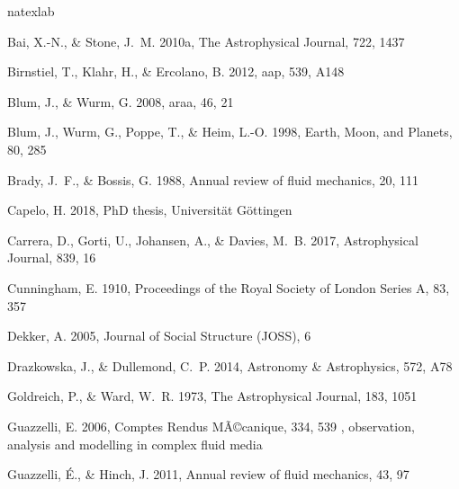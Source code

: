 %
%
\begin{thebibliography}{}
\expandafter\ifx\csname natexlab\endcsname\relax\def\natexlab#1{#1}\fi

Bai, X.-N., \& Stone, J.~M. 2010a, The Astrophysical Journal, 722, 1437

{Birnstiel}, T., {Klahr}, H., \& {Ercolano}, B. 2012, aap, 539, A148

{Blum}, J., \& {Wurm}, G. 2008, araa, 46, 21

Blum, J., Wurm, G., Poppe, T., \& Heim, L.-O. 1998, Earth, Moon, and Planets,
  80, 285

Brady, J.~F., \& Bossis, G. 1988, Annual review of fluid mechanics, 20, 111

{Capelo}, H. 2018, PhD thesis, Universit{\"a}t G{\"o}ttingen

{Carrera}, D., {Gorti}, U., {Johansen}, A., \& {Davies}, M.~B. 2017,
  Astrophysical Journal, 839, 16

{Cunningham}, E. 1910, Proceedings of the Royal Society of London Series A, 83,
  357

Dekker, A. 2005, Journal of Social Structure (JOSS), 6

Drazkowska, J., \& Dullemond, C.~P. 2014, Astronomy \& Astrophysics, 572, A78

{Goldreich}, P., \& {Ward}, W.~R. 1973, The Astrophysical Journal, 183, 1051

Guazzelli, E. 2006, Comptes Rendus MÃ©canique, 334, 539 , observation,
  analysis and modelling in complex fluid media

Guazzelli, {\'E}., \& Hinch, J. 2011, Annual review of fluid mechanics, 43, 97


\end{thebibliography}
